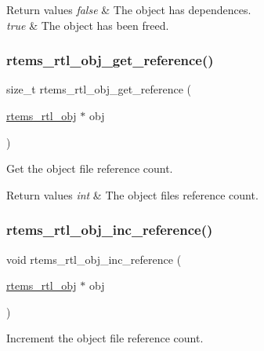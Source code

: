\begin{DoxyRetVals}{Return values}
{\em false} & The object has dependences. \\
\hline
{\em true} & The object has been freed. \\
\hline
\end{DoxyRetVals}
\mbox{\label{rtl-obj_8h_a1e3d355bd13971d7bc629cb890b261bf}} 
\subsubsection{\texorpdfstring{rtems\_rtl\_obj\_get\_reference()}{rtems\_rtl\_obj\_get\_reference()}}
{\footnotesize\ttfamily size\+\_\+t rtems\+\_\+rtl\+\_\+obj\+\_\+get\+\_\+reference (\begin{DoxyParamCaption}\item[{\mbox{\hyperlink{structrtems__rtl__obj}{rtems\+\_\+rtl\+\_\+obj}} $\ast$}]{obj }\end{DoxyParamCaption})}

Get the object file reference count.


\begin{DoxyRetVals}{Return values}
{\em int} & The object file\textquotesingle{}s reference count. \\
\hline
\end{DoxyRetVals}
\mbox{\label{rtl-obj_8h_a86116ffbe87cb58f2428e6c66e4db58e}} 
\subsubsection{\texorpdfstring{rtems\_rtl\_obj\_inc\_reference()}{rtems\_rtl\_obj\_inc\_reference()}}
{\footnotesize\ttfamily void rtems\+\_\+rtl\+\_\+obj\+\_\+inc\+\_\+reference (\begin{DoxyParamCaption}\item[{\mbox{\hyperlink{structrtems__rtl__obj}{rtems\+\_\+rtl\+\_\+obj}} $\ast$}]{obj }\end{DoxyParamCaption})}

Increment the object file reference count.


